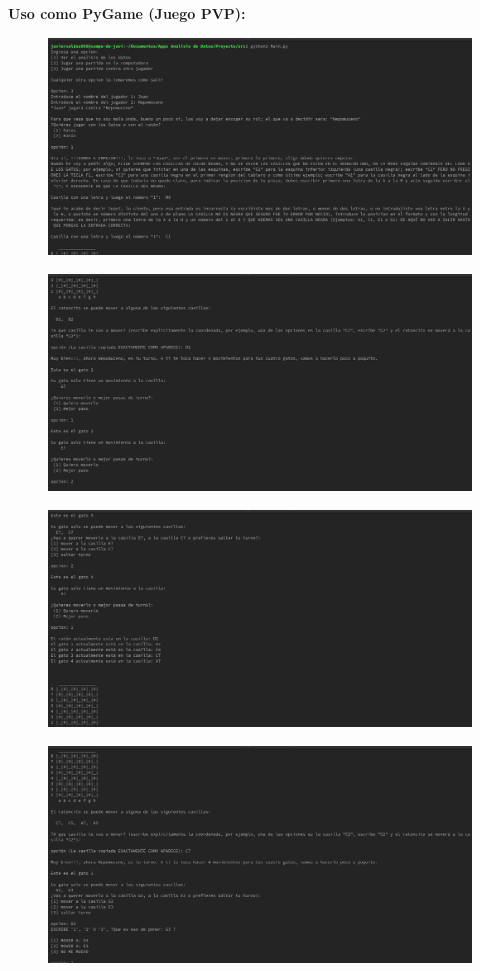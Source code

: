 \documentclass[12pt, Tahoma]{article}
\begin{document}
	
	\textbf{Uso como PyGame (Juego PVP): }
	\begin{figure}[H]
		\centering
		\includegraphics[scale=0.3]{Resultados8.png}
	\end{figure}
	\begin{figure}[H]
		\centering
		\includegraphics[scale=0.3]{Resultados9.png}
	\end{figure}
	\begin{figure}[H]
		\centering
		\includegraphics[scale=0.3]{Resultados10.png}
	\end{figure}
	\begin{figure}[H]
		\centering
		\includegraphics[scale=0.3]{Resultados11.png}
	\end{figure}
\end{document}
